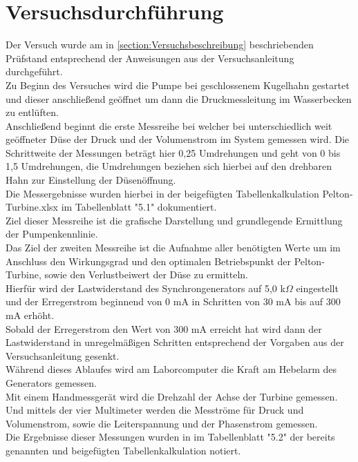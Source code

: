 \section{Versuchsdurchführung}
Der Versuch wurde am in \autoref{section:Versuchsbeschreibung} beschriebenden Prüfstand entsprechend der Anweisungen aus der Versuchsanleitung \cite[S.11-14]{Anleitung} durchgeführt.\\
Zu Beginn des Versuches wird die Pumpe bei geschlossenem Kugelhahn gestartet und dieser anschließend geöffnet um dann die Druckmessleitung im Wasserbecken zu entlüften.\\
Anschließend beginnt die erste Messreihe bei welcher bei unterschiedlich weit geöffneter Düse der Druck und der Volumenstrom im System gemessen wird.
Die Schrittweite der Messungen beträgt hier 0,25 Umdrehungen und geht von 0 bis 1,5 Umdrehungen, die Umdrehungen beziehen sich hierbei auf den drehbaren Hahn zur Einstellung der Düsenöffnung.\\
Die Messergebnisse wurden hierbei in der beigefügten Tabellenkalkulation Pelton-Turbine.xlsx im Tabellenblatt "5.1" dokumentiert.\\
Ziel dieser Messreihe ist die grafische Darstellung und grundlegende Ermittlung der Pumpenkennlinie.\\
\newline
Das Ziel der zweiten Messreihe ist die Aufnahme aller benötigten Werte um im Anschluss den Wirkungsgrad und den optimalen Betriebspunkt der Pelton-Turbine,
 sowie den Verlustbeiwert der Düse zu ermitteln.\\
 Hierfür wird der Lastwiderstand des Synchrongenerators auf 5,0 k$\Omega$ eingestellt und der Erregerstrom beginnend von 0 mA in Schritten von 30 mA bis auf 300 mA erhöht.\\
 Sobald der Erregerstrom den Wert von 300 mA erreicht hat wird dann der Lastwiderstand in unregelmäßigen Schritten entsprechend der Vorgaben aus der Versuchsanleitung \cite[S.12]{Anleitung} gesenkt.\\
 Während dieses Ablaufes wird am Laborcomputer die Kraft am Hebelarm des Generators gemessen.\\
 Mit einem Handmessgerät wird die Drehzahl der Achse der Turbine gemessen.\\
 Und mittels der vier Multimeter werden die Mesströme für Druck und Volumenstrom, sowie die Leiterspannung und der Phasenstrom gemessen.\\
 Die Ergebnisse dieser Messungen wurden in im Tabellenblatt "5.2" der bereits genannten und beigefügten Tabellenkalkulation notiert.\\
